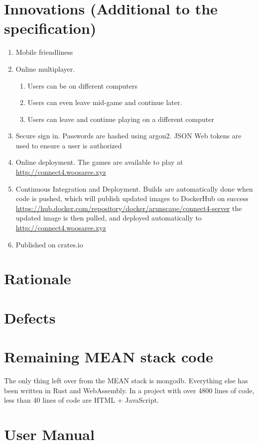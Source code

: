 \documentclass[letterpaper]{article}
\begin{document}
\section{Innovations (Additional to the specification)}
\begin{enumerate}
    \item Mobile friendliness
    \item Online multiplayer.
        \begin{enumerate}
            \item Users can be on different computers
            \item Users can even leave mid-game and continue later.
            \item Users can leave and continue playing on a different computer
        \end{enumerate}
    \item Secure sign in. Passwords are hashed using argon2. JSON Web tokens are used to ensure a user
        is authorized 
    \item Online deployment. The games are available to play at \url{http://connect4.woosaree.xyz}
    \item Continuous Integration and Deployment. Builds are automatically done when code is pushed,
        which will publish updated images to DockerHub on success \url{https://hub.docker.com/repository/docker/arunscape/connect4-server}
        the updated image is then pulled, and deployed automatically to \url{http://connect4.woosaree.xyz}
    \item Published on crates.io
        
\end{enumerate}

\section{Rationale}

\section{Defects}

\section{Remaining MEAN stack code}
The only thing left over from the MEAN stack is mongodb. Everything else has been written
in Rust and WebAssembly. In a project with over 4800 lines of code,
less than 40 lines of code are HTML + JavaScript. 


\section{User Manual}
\end{document}
